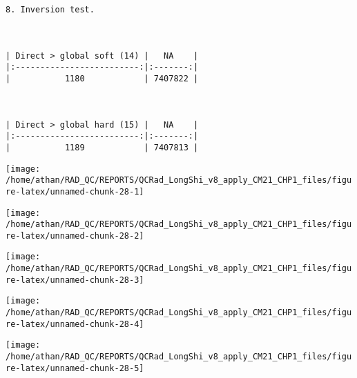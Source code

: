 \documentclass[
  10pt,
  a4paper,oneside]{article}
\newenvironment{Shaded}{\begin{snugshade}}{\end{snugshade}}
\newcommand{\DataTypeTok}[1]{\textcolor[rgb]{0.13,0.29,0.53}{#1}}
\newcommand{\DecValTok}[1]{\textcolor[rgb]{0.00,0.00,0.81}{#1}}
\newcommand{\KeywordTok}[1]{\textcolor[rgb]{0.13,0.29,0.53}{\textbf{#1}}}
\newcommand{\NormalTok}[1]{#1}
\newcommand{\OperatorTok}[1]{\textcolor[rgb]{0.81,0.36,0.00}{\textbf{#1}}}
\newcommand{\OtherTok}[1]{\textcolor[rgb]{0.56,0.35,0.01}{#1}}
\begin{document}
\begin{Shaded}
\end{Shaded}

\begin{verbatim}
8. Inversion test.



| Direct > global soft (14) |   NA    |
|:-------------------------:|:-------:|
|           1180            | 7407822 |



| Direct > global hard (15) |   NA    |
|:-------------------------:|:-------:|
|           1189            | 7407813 |
\end{verbatim}

\begin{center}\texttt{[image: /home/athan/RAD\_QC/REPORTS/QCRad\_LongShi\_v8\_apply\_CM21\_CHP1\_files/figure-latex/unnamed-chunk-28-1]} \end{center}

\begin{center}\texttt{[image: /home/athan/RAD\_QC/REPORTS/QCRad\_LongShi\_v8\_apply\_CM21\_CHP1\_files/figure-latex/unnamed-chunk-28-2]} \end{center}

\begin{center}\texttt{[image: /home/athan/RAD\_QC/REPORTS/QCRad\_LongShi\_v8\_apply\_CM21\_CHP1\_files/figure-latex/unnamed-chunk-28-3]} \end{center}

\begin{center}\texttt{[image: /home/athan/RAD\_QC/REPORTS/QCRad\_LongShi\_v8\_apply\_CM21\_CHP1\_files/figure-latex/unnamed-chunk-28-4]} \end{center}

\begin{center}\texttt{[image: /home/athan/RAD\_QC/REPORTS/QCRad\_LongShi\_v8\_apply\_CM21\_CHP1\_files/figure-latex/unnamed-chunk-28-5]} \end{center}
\end{document}
